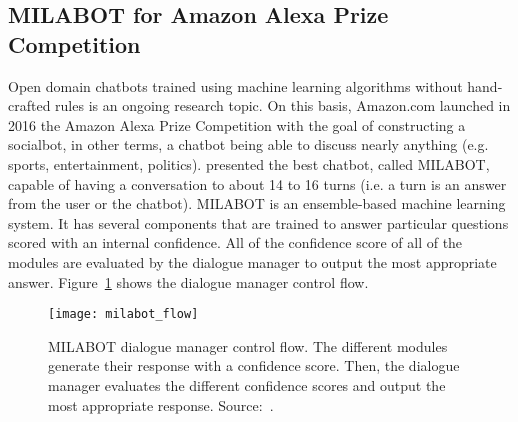 \subsection{MILABOT for Amazon Alexa Prize Competition}
Open domain chatbots trained using machine learning algorithms without hand-crafted rules is an ongoing research topic. On this basis, Amazon.com launched in 2016 the Amazon Alexa Prize Competition with the goal of constructing a socialbot, in other terms, a chatbot being able to discuss nearly anything (e.g. sports, entertainment, politics). \citet{alexa-1709.02349} presented the best chatbot, called MILABOT, capable of having a conversation to about 14 to 16 turns (i.e. a turn is an answer from the user or the chatbot).
MILABOT is an ensemble-based machine learning system. It has several components that are trained to answer particular questions scored with an internal confidence. All of the confidence score of all of the modules are evaluated by the dialogue manager to output the most appropriate answer. Figure~\ref{fig:milabot-flow} shows the dialogue manager control flow.

\begin{figure}
    \centering
    \texttt{[image: milabot\_flow]}
    \decoRule
    \caption[MILABOT dialogue manager control flow]{MILABOT dialogue manager control flow. The different modules generate their response with a confidence score. Then, the dialogue manager evaluates the different confidence scores and output the most appropriate response. Source:~\citet{alexa-1709.02349}.}
    \label{fig:milabot-flow}
\end{figure}
